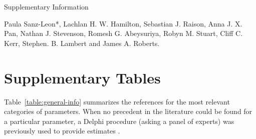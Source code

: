 \documentclass[article, a4, authoryear]{elsarticle}
\begin{document}
\newpage
\appendix
\section*{}

\begin{center}
    {\Large {Supplementary Information}}
    \vspace{1cm}
    
    Paula Sanz-Leon*, Lachlan H. W.  Hamilton, Sebastian J. Raison, Anna J. X. Pan, Nathan J. Stevenson, Romesh G. Abeysuriya, Robyn M. Stuart, Cliff C. Kerr, Stephen. B. Lambert and James A. Roberts.
\end{center}


\section{Supplementary Tables}
\setcounter{page}{1}
\renewcommand{\tablename}{Supplementary Table}
\renewcommand{\thetable}{S\arabic{table}}
\setcounter{table}{0}

Table~\ref{table:general-info} summarizes the references for the most relevant categories of parameters. When no precedent in the literature could be found for a particular parameter, a Delphi procedure (asking a panel of experts) was previously used to provide estimates \citep{kerr2020covasim,scott2020modelling}.
\end{document}
